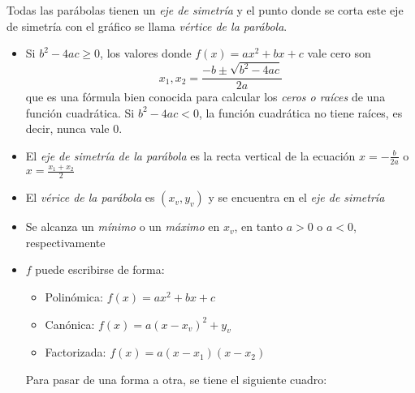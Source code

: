\documentclass[../teoria.root.tex]{subfiles}
\begin{document}
Todas las parábolas tienen un \textit{eje de simetría} y el punto donde se corta este eje de simetría con el gráfico se llama \textit{vértice de la parábola}.
\begin{itemize}
    \item Si \(b^2 − 4ac \geq 0\), los valores donde \(f(x) = ax^2 + bx + c\) vale cero son \[x_1,x_2=\frac{-b\pm\sqrt{b^2-4ac}}{2a}\] que es una fórmula bien conocida para calcular los \textit{ceros o raíces} de una función cuadrática.
          Si \(b^2 − 4ac < 0\), la función cuadrática no tiene raíces, es decir, nunca vale 0.
    \item El \textit{eje de simetría de la parábola} es la recta vertical de la ecuación \(x=-\frac{b}{2a}\) o \(x=\frac{x_1+x_2}{2}\)
    \item El \textit{vérice de la parábola} es \((x_v,y_v)\) y se encuentra en el \textit{eje de simetría}
    \item Se alcanza un \textit{mínimo} o un \textit{máximo} en \(x_v\), en tanto \(a>0\) o \(a<0\), respectivamente
    \item \(f\) puede escribirse de forma:
          \begin{itemize}
              \item Polinómica:
                    \(f(x)=ax^2+bx+c\)
              \item Canónica:
                    \(f(x)=a(x-x_v)^2+y_v\)
              \item Factorizada:
                    \(f(x)=a(x-x_1)(x-x_2)\)
          \end{itemize}
          Para pasar de una forma a otra, se tiene el siguiente cuadro:
          \begin{center}
              \begin{scaletikzpicturetowidth}{\linewidth}
              \end{scaletikzpicturetowidth}
          \end{center}
\end{itemize}
\end{document}
